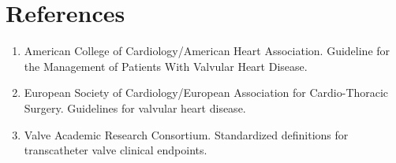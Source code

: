 \section*{References}
\begin{enumerate}
\item American College of Cardiology/American Heart Association. Guideline for the Management of Patients With Valvular Heart Disease.
\item European Society of Cardiology/European Association for Cardio-Thoracic Surgery. Guidelines for valvular heart disease.
\item Valve Academic Research Consortium. Standardized definitions for transcatheter valve clinical endpoints.
\end{enumerate}

